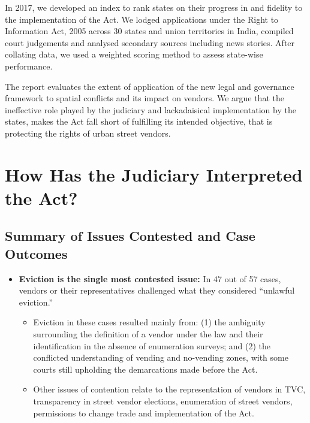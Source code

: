 \documentclass[a4paper, 12pt, twoside]{article}
\begin{document}
In 2017, we developed an index to rank states on their progress in and fidelity to the implementation of the Act. We lodged applications under the Right to Information Act, 2005 across 30 states and union territories in India, compiled court judgements and analysed secondary sources including news stories. After collating data, we used a weighted scoring method to assess state-wise performance.


The report evaluates the extent of application of the new legal and governance framework to spatial conflicts and its impact on vendors. We argue that the ineffective role played by the judiciary and lackadaisical implementation by the states, makes the Act fall short of fulfilling its intended objective, that is protecting the rights of urban street vendors.
\section*{How Has the Judiciary Interpreted the Act?}


\subsection*{Summary of Issues Contested and Case Outcomes}

\begin{itemize}[nosep]
\item \textbf{Eviction is the single most contested issue:} In 47 out of 57 cases, vendors or their representatives challenged what they considered “unlawful eviction.”

\begin{itemize}
\item Eviction in these cases resulted mainly from: (1) the ambiguity surrounding the definition of a vendor under the law and their identification in the absence of enumeration surveys; and (2) the conflicted understanding of vending and no-vending zones, with some courts still upholding the demarcations made before the Act.

\item Other issues of contention relate to the representation of vendors in TVC, transparency in street vendor elections, enumeration of street vendors, permissions to change trade and implementation of the Act.

\end{itemize}
\end{itemize}
\end{document}
